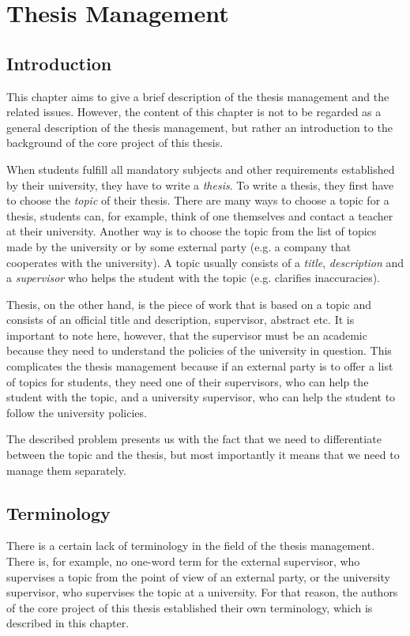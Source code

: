 \chapter{Thesis Management}

\section{Introduction}

This chapter aims to give a brief description of the thesis management and the related issues. However, the content of this chapter is not to be regarded as a general description of the thesis management, but rather an introduction to the background of the core project of this thesis.

When students fulfill all mandatory subjects and other requirements established by their university, they have to write a \emph{thesis}. To write a thesis, they first have to choose the \emph{topic} of their thesis. There are many ways to choose a topic for a thesis, students can, for example, think of one themselves and contact a teacher at their university. Another way is to choose the topic from the list of topics made by the university or by some external party (e.g. a company that cooperates with the university). A topic usually consists of a \emph{title}, \emph{description} and a \emph{supervisor} who helps the student with the topic (e.g. clarifies inaccuracies).

Thesis, on the other hand, is the piece of work that is based on a topic and consists of an official title and description, supervisor, abstract etc. It is important to note here, however, that the supervisor must be an academic because they need to understand the policies of the university in question. This complicates the thesis management because if an external party is to offer a list of topics for students, they need one of their supervisors, who can help the student with the topic, and a university supervisor, who can help the student to follow the university policies.

The described problem presents us with the fact that we need to differentiate between the topic and the thesis, but most importantly it means that we need to manage them separately.

\section{Terminology}

There is a certain lack of terminology in the field of the thesis management. There is, for example, no one-word term for the external supervisor, who supervises a topic from the point of view of an external party, or the university supervisor, who supervises the topic at a university. For that reason, the authors of the core project of this thesis established their own terminology, which is described in this chapter.

